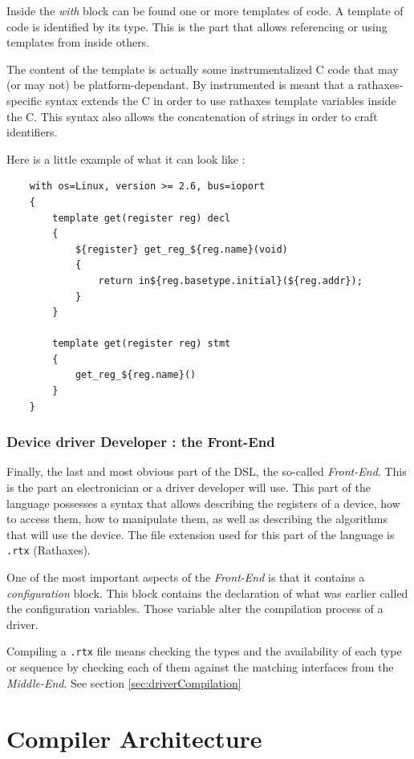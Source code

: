 \documentclass{rtxreport}
\begin{document}
Inside the \emph{with} block can be found one or more templates of code. A
template of code is identified by its type. This is the part that allows
referencing or using templates from inside others.

The content of the template is actually some instrumentalized C code that may
(or may not) be platform-dependant. By instrumented is meant that a
rathaxes-specific syntax extends the C in order to use rathaxes template
variables inside the C. This syntax also allows the concatenation of strings
in order to craft identifiers.

Here is a little example of what it can look like :
\begin{lstlisting}
    with os=Linux, version >= 2.6, bus=ioport
    {
        template get(register reg) decl
        {
            ${register} get_reg_${reg.name}(void)
            {
                return in${reg.basetype.initial}(${reg.addr});
            }
        }

        template get(register reg) stmt
        {
            get_reg_${reg.name}()
        }
    }
\end{lstlisting}

\subsection{Device driver Developer : the Front-End}
\lstset{language=rtx}

Finally, the last and most obvious part of the DSL, the so-called
\emph{Front-End}. This is the part an electronician or a driver developer will
use. This part of the language possesses a syntax that allows describing the
registers of a device, how to access them, how to manipulate them, as well as
describing the algorithms that will use the device. The file extension used
for this part of the language is \texttt{.rtx} (Rathaxes).

One of the most important aspects of the \emph{Front-End} is that it contains a
\emph{configuration} block. This block contains the declaration of what was
earlier called the configuration variables. Those variable alter the compilation
process of a driver.

Compiling a \texttt{.rtx} file means checking the types and the availability of
each type or sequence by checking each of them against the matching interfaces
from the \emph{Middle-End}. See section
\ref{sec:driverCompilation}



\chapter{Compiler Architecture} %
\end{document}
